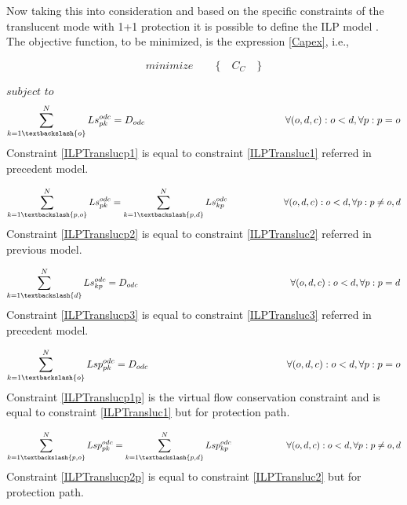 Now taking this into consideration and based on the specific constraints of the translucent mode with 1+1 protection it is possible to define the ILP model \cite{zhu_transl} \cite{zhu_transl2}.\\
The objective function, to be minimized, is the expression \ref{Capex}, i.e.,

\begin{equation*}
  minimize \qquad \Big\{ \quad C_C \quad \Big\}
\end{equation*}

$subject$ $to$
\begin{equation}
\sum_{k=1\textbackslash \{o\}}^{N} Ls_{pk}^{odc} = D_{odc} \qquad \qquad \qquad \qquad \qquad \qquad \qquad
\forall(o,d,c) : o < d, \forall p: p = o
\label{ILPTranslucp1}
\end{equation}
\noindent
Constraint \ref{ILPTranslucp1} is equal to constraint \ref{ILPTransluc1} referred in precedent model.

\begin{equation}
\sum_{k=1\textbackslash \{p,o\}}^{N} Ls_{pk}^{odc} = \sum_{k=1\textbackslash \{p,d\}}^{N} Ls_{kp}^{odc} \qquad \qquad \qquad
\forall(o,d,c) : o < d, \forall p: p \neq o,d
\label{ILPTranslucp2}
\end{equation}
\noindent
Constraint \ref{ILPTranslucp2} is equal to constraint \ref{ILPTransluc2} referred in previous model.

\begin{equation}
\sum_{k=1\textbackslash \{d\}}^{N} Ls_{kp}^{odc} = D_{odc} \qquad \qquad \qquad \qquad \qquad \qquad \qquad \qquad
\forall(o,d,c) : o < d, \forall p: p = d
\label{ILPTranslucp3}
\end{equation}
\noindent
Constraint \ref{ILPTranslucp3} is equal to constraint \ref{ILPTransluc3} referred in precedent model.

\begin{equation}
\sum_{k=1\textbackslash \{o\}}^{N} Lsp_{pk}^{odc} = D_{odc} \qquad \qquad \qquad \qquad \qquad \qquad \qquad
\forall(o,d,c) : o < d, \forall p: p = o
\label{ILPTranslucp1p}
\end{equation}
\noindent
Constraint \ref{ILPTranslucp1p} is the virtual flow conservation constraint and is equal to constraint \ref{ILPTransluc1} but for protection path.

\begin{equation}
\sum_{k=1\textbackslash \{p,o\}}^{N} Lsp_{pk}^{odc} = \sum_{k=1\textbackslash \{p,d\}}^{N} Lsp_{kp}^{odc} \qquad \qquad \qquad
\forall(o,d,c) : o < d, \forall p: p \neq o,d
\label{ILPTranslucp2p}
\end{equation}
\noindent
Constraint \ref{ILPTranslucp2p} is equal to constraint \ref{ILPTransluc2} but for protection path.

